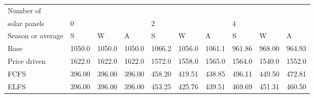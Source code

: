 \begin{table}[h] 
\centering 
\begin{tabular}{l|lll|lll|lll}Number of \\ solar panels&0& & &2& & &4& & \\ \hline 
Season or average & S & W & A & S & W & A & S & W & A \\ \hline 
Base&1050.0&1050.0&1050.0&1066.2&1056.0&1061.1&961.86&968.00&964.93 \\ 
Price driven&1622.0&1622.0&1622.0&1572.0&1558.0&1565.0&1564.0&1540.0&1552.0 \\ 
FCFS&396.00&396.00&396.00&458.20&419.51&438.85&496.11&449.50&472.81 \\ 
ELFS&396.00&396.00&396.00&453.25&425.76&439.51&469.69&451.31&460.50 \\ 
\end{tabular} 
\end{table}